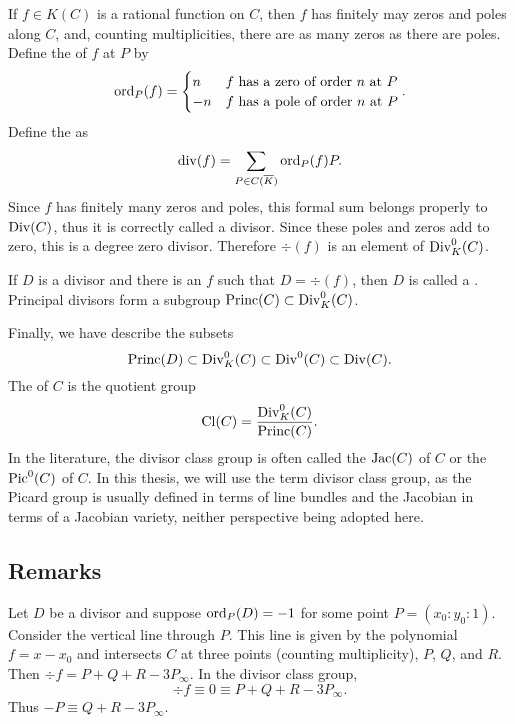 If $f \in K(C)$ is a rational function on $C$,
then $f$ has finitely may zeros and poles along $C$, and,
counting multiplicities, there are as many zeros as there are poles.
Define the  of $f$ at $P$ by
\[ \operatorname{ord}_P(f) = \begin{cases}
  n & \text{$f$ has a zero of order $n$ at $P$} \\
  -n & \text{$f$ has a pole of order $n$ at $P$}
\end{cases}. \]
Define the  as
\[ \operatorname{div}(f) = \sum_{P \in C(\overline K)} \operatorname{ord}_P(f) P. \]
Since $f$ has finitely many zeros and poles, this formal sum belongs properly to $\operatorname{Div}(C)$,
thus it is correctly called a divisor.
Since these poles and zeros add to zero, this is a degree zero divisor.
Therefore $\div (f)$ is an element of $\operatorname{Div}_K^0(C)$.

If $D$ is a divisor and there is an $f$ such that $D = \div(f)$,
then $D$ is called a .
Principal divisors form a subgroup  $\operatorname{Princ}(C) \subset \operatorname{Div}_K^0(C)$.

Finally, we have describe the subsets
\[ \operatorname{Princ}(D) \subset \operatorname{Div}_K^0(C) \subset \operatorname{Div}^0(C) \subset \operatorname{Div}(C). \]
The  of $C$ is the quotient group
\[ \operatorname{Cl}(C) = \frac {\operatorname{Div}_K^0(C)} {\operatorname{Princ}(C)}. \]
In the literature, the divisor class group is often called the  $\operatorname{Jac}(C)$ of $C$
or the  $\operatorname{Pic}^0(C)$ of $C$.
In this thesis, we will use the term divisor class group,
as the Picard group is usually defined in terms of line bundles
and the Jacobian in terms of a Jacobian variety,
neither perspective being adopted here.



\subsection{Remarks}

Let $D$ be a divisor and suppose $\operatorname{ord}_P(D) = -1$ for some point $P = (x_0 : y_0 : 1)$.
Consider the vertical line through $P$.
This line is given by the polynomial $f = x - x_0$ and intersects $C$ at three points (counting multiplicity), $P$, $Q$, and $R$.
Then $\div f = P + Q + R - 3P_\infty$.
In the divisor class group,
  \[ \div f \equiv 0 \equiv P + Q + R - 3P_\infty. \]
Thus $-P \equiv Q + R - 3P_\infty$.

